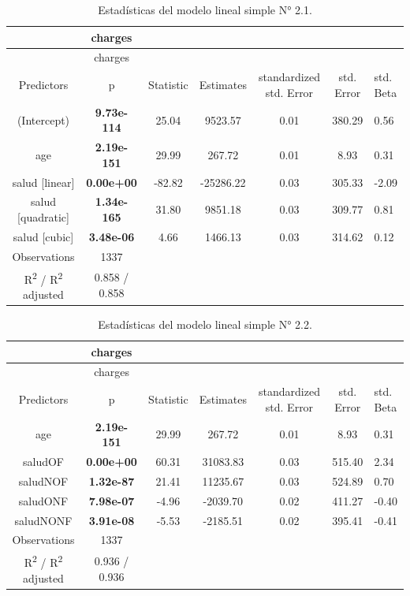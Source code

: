 \documentclass[
  letterpaper,
]{book}
\begin{document}
\hypertarget{tbl-stats_modelo2_simple}{}
\begin{longtable}[]{@{}ccccccl@{}}
\caption{\label{tbl-stats_modelo2_simple}Estadísticas del modelo lineal
simple N° 2.1.}\tabularnewline
\toprule()
~ & charges & & & & & \\
\midrule()
\endfirsthead
\toprule()
~ & charges & & & & & \\
\midrule()
\endhead
Predictors & p & Statistic & Estimates & standardized std. Error & std.
Error & std. Beta \\
(Intercept) & \textbf{9.73e-114} & 25.04 & 9523.57 & 0.01 & 380.29 &
0.56 \\
age & \textbf{2.19e-151} & 29.99 & 267.72 & 0.01 & 8.93 & 0.31 \\
salud {[}linear{]} & \textbf{0.00e+00} & -82.82 & -25286.22 & 0.03 &
305.33 & -2.09 \\
salud {[}quadratic{]} & \textbf{1.34e-165} & 31.80 & 9851.18 & 0.03 &
309.77 & 0.81 \\
salud {[}cubic{]} & \textbf{3.48e-06} & 4.66 & 1466.13 & 0.03 & 314.62 &
0.12 \\
Observations & 1337 & & & & & \\
R\textsuperscript{2} / R\textsuperscript{2} adjusted & 0.858 / 0.858 & &
& & & \\
\bottomrule()
\end{longtable}

\hypertarget{tbl-stats_modelo2_2_simple}{}
\begin{longtable}[]{@{}ccccccl@{}}
\caption{\label{tbl-stats_modelo2_2_simple}Estadísticas del modelo
lineal simple N° 2.2.}\tabularnewline
\toprule()
~ & charges & & & & & \\
\midrule()
\endfirsthead
\toprule()
~ & charges & & & & & \\
\midrule()
\endhead
Predictors & p & Statistic & Estimates & standardized std. Error & std.
Error & std. Beta \\
age & \textbf{2.19e-151} & 29.99 & 267.72 & 0.01 & 8.93 & 0.31 \\
saludOF & \textbf{0.00e+00} & 60.31 & 31083.83 & 0.03 & 515.40 & 2.34 \\
saludNOF & \textbf{1.32e-87} & 21.41 & 11235.67 & 0.03 & 524.89 &
0.70 \\
saludONF & \textbf{7.98e-07} & -4.96 & -2039.70 & 0.02 & 411.27 &
-0.40 \\
saludNONF & \textbf{3.91e-08} & -5.53 & -2185.51 & 0.02 & 395.41 &
-0.41 \\
Observations & 1337 & & & & & \\
R\textsuperscript{2} / R\textsuperscript{2} adjusted & 0.936 / 0.936 & &
& & & \\
\bottomrule()
\end{longtable}
\end{document}
